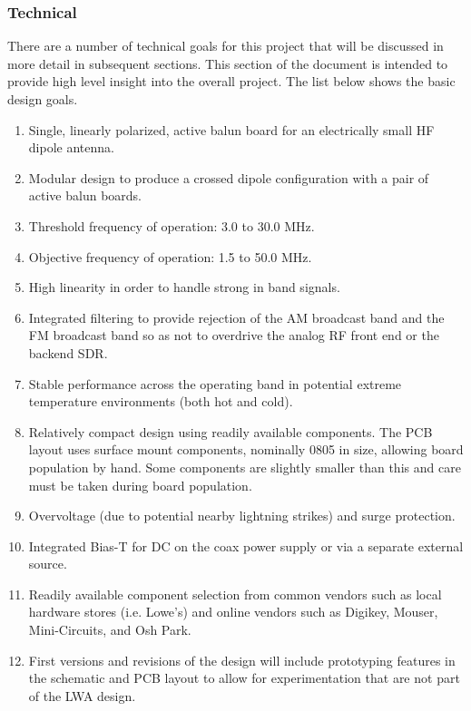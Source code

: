 \subsubsection{Technical}
There are a number of technical goals for this project that will be discussed in more detail in subsequent sections.
This section of the document is intended to provide high level insight into the overall project.
The list below shows the basic design goals.

\begin{enumerate}[noitemsep]
	\item{Single, linearly polarized, active balun board for an electrically small HF dipole antenna.}
	\item{Modular design to produce a crossed dipole configuration with a pair of active balun boards.}
	\item{Threshold frequency of operation: 3.0 to 30.0 MHz.}
	\item{Objective frequency of operation: 1.5 to 50.0 MHz.}
	\item{High linearity in order to handle strong in band signals.}
	\item{Integrated filtering to provide rejection of the AM broadcast band and the FM broadcast band so as not to overdrive the analog RF front end or the backend SDR.}
	\item{Stable performance across the operating band in potential extreme temperature environments (both hot and cold).}
	\item{Relatively compact design using readily available components.  The PCB layout uses surface mount components, nominally 0805 in size, allowing board population by hand.  Some components are slightly smaller than this and care must be taken during board population.}
	\item{Overvoltage (due to potential nearby lightning strikes) and surge protection.}
	\item{Integrated Bias-T for DC on the coax power supply or via a separate external source.}
	\item{Readily available component selection from common vendors such as local hardware stores (i.e. Lowe's) and online vendors such as Digikey, Mouser, Mini-Circuits, and Osh Park.}
	\item{First versions and revisions of the design will include prototyping features in the schematic and PCB layout to allow for experimentation that are not part of the LWA design.}
\end{enumerate}


